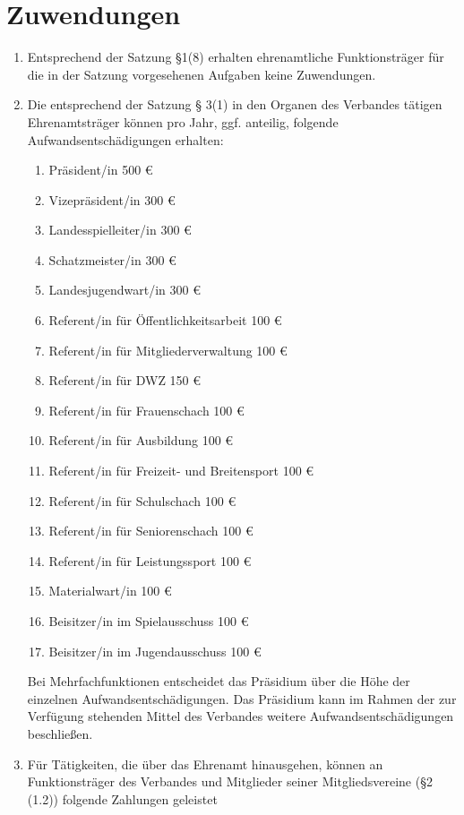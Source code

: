 \documentclass[fontsize=12pt, paper=a4, ngerman]{article}
\begin{document}
\section{Zuwendungen}
\begin{enumerate}
\item Entsprechend der Satzung §1(8) erhalten ehrenamtliche Funktionsträger für die in der
Satzung vorgesehenen Aufgaben keine Zuwendungen.
\item Die entsprechend der Satzung § 3(1) in den Organen des Verbandes tätigen
Ehrenamtsträger können pro Jahr, ggf. anteilig, folgende Aufwandsentschädigungen
erhalten:
  \begin{enumerate}[label=-]
  \item Präsident/in \hfill 500 €
  \item Vizepräsident/in \hfill 300 €
  \item Landesspielleiter/in \hfill 300 €
  \item Schatzmeister/in \hfill 300 €
  \item Landesjugendwart/in \hfill 300 €
  \item Referent/in für Öffentlichkeitsarbeit \hfill 100 €
  \item Referent/in für Mitgliederverwaltung \hfill 100 €
  \item Referent/in für DWZ \hfill 150 €
  \item Referent/in für Frauenschach \hfill 100 €
  \item Referent/in für Ausbildung \hfill 100 €
  \item Referent/in für Freizeit- und Breitensport \hfill 100 €
  \item Referent/in für Schulschach \hfill 100 €
  \item Referent/in für Seniorenschach \hfill 100 €
  \item Referent/in für Leistungssport \hfill 100 €
  \item Materialwart/in \hfill 100 €
  \item Beisitzer/in im Spielausschuss \hfill 100 €
  \item Beisitzer/in im Jugendausschuss \hfill 100 €
  \end{enumerate}
Bei Mehrfachfunktionen entscheidet das Präsidium über die Höhe der einzelnen
Aufwandsentschädigungen.
Das Präsidium kann im Rahmen der zur Verfügung stehenden Mittel des Verbandes weitere
Aufwandsentschädigungen beschließen.
\item Für Tätigkeiten, die über das Ehrenamt hinausgehen, können an Funktionsträger des
Verbandes und Mitglieder seiner Mitgliedsvereine (§2 (1.2)) folgende Zahlungen geleistet

\end{enumerate}
\end{document}
